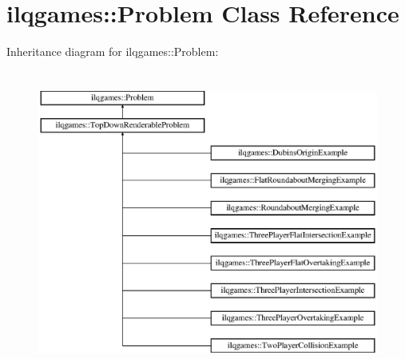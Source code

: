 \hypertarget{classilqgames_1_1_problem}{}\section{ilqgames\+:\+:Problem Class Reference}
\label{classilqgames_1_1_problem}
Inheritance diagram for ilqgames\+:\+:Problem\+:\begin{figure}[H]
\begin{center}
\leavevmode
\includegraphics[height=10.000000cm]{classilqgames_1_1_problem}
\end{center}
\end{figure}
